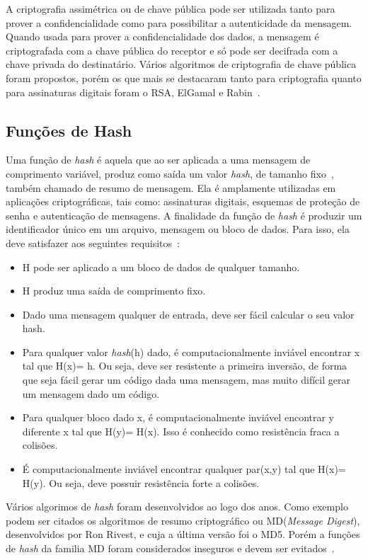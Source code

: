 A criptografia assimétrica ou de chave pública pode ser utilizada tanto para prover a confidencialidade como para possibilitar a autenticidade da mensagem. Quando usada para prover a confidencialidade dos dados, a mensagem é criptografada com a chave pública do receptor e só pode ser decifrada com a chave privada do destinatário. Vários algoritmos de criptografia de chave pública foram propostos, porém os que mais se destacaram  tanto para  criptografia quanto para assinaturas digitais foram o RSA, ElGamal e Rabin~\cite{Schneier1995}.

\subsection{Funções de Hash}
Uma função de \emph{hash} é aquela que ao ser aplicada a uma mensagem de comprimento variável, produz como saída um valor \emph{hash}, de tamanho fixo~\cite{Schneier1995}, também chamado de resumo de mensagem. Ela é amplamente utilizadas em aplicações criptográficas, tais como: assinaturas digitais, esquemas de proteção de senha e autenticação de mensagens. A finalidade da função de \emph{hash} é produzir um identificador único em um arquivo, mensagem ou bloco de dados. Para isso, ela deve satisfazer aos seguintes requisitos~\cite{stallings2008}:
\begin{itemize}
\item H pode ser aplicado a um bloco de dados de qualquer tamanho.
\item H produz uma saída de comprimento fixo.
\item Dado uma mensagem qualquer de entrada, deve ser fácil calcular o seu valor hash.
\item Para qualquer valor \emph{hash}(h) dado, é computacionalmente inviável encontrar x tal que H(x)= h. Ou seja,  deve ser resistente a primeira inversão, de forma que seja fácil gerar um código dada uma mensagem, mas muito difícil gerar um mensagem dado um código.
\item Para qualquer bloco dado x, é computacionalmente inviável encontrar y diferente x tal que H(y)= H(x). Isso é conhecido como resistência fraca a colisões.

\item É computacionalmente inviável encontrar qualquer par(x,y) tal que H(x)= H(y). Ou seja, deve possuir resistência forte a colisões.

\end{itemize}

Vários algorimos de \emph{hash} foram desenvolvidos ao logo dos anos. Como exemplo podem ser citados os algoritmos de resumo criptográfico ou MD(\emph{Message Digest}), desenvolvidos por Ron Rivest, e cuja a última versão foi o MD5. Porém a funções de \emph{hash} da familia MD foram considerados inseguros e devem ser evitados~\cite{forouzan2013redes}.

